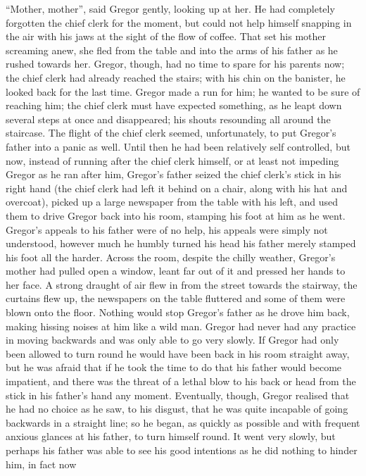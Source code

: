“Mother, mother”, said Gregor gently, looking up at her. He had
completely forgotten the chief clerk for the moment, but could not help
himself snapping in the air with his jaws at the sight of the flow of
coffee. That set his mother screaming anew, she fled from the table and
into the arms of his father as he rushed towards her. Gregor, though,
had no time to spare for his parents now; the chief clerk had already
reached the stairs; with his chin on the banister, he looked back for
the last time. Gregor made a run for him; he wanted to be sure of
reaching him; the chief clerk must have expected something, as he leapt
down several steps at once and disappeared; his shouts resounding all
around the staircase. The flight of the chief clerk seemed,
unfortunately, to put Gregor’s father into a panic as well. Until then
he had been relatively self controlled, but now, instead of running
after the chief clerk himself, or at least not impeding Gregor as he
ran after him, Gregor’s father seized the chief clerk’s stick in his
right hand (the chief clerk had left it behind on a chair, along with
his hat and overcoat), picked up a large newspaper from the table with
his left, and used them to drive Gregor back into his room, stamping
his foot at him as he went. Gregor’s appeals to his father were of no
help, his appeals were simply not understood, however much he humbly
turned his head his father merely stamped his foot all the harder.
Across the room, despite the chilly weather, Gregor’s mother had pulled
open a window, leant far out of it and pressed her hands to her face. A
strong draught of air flew in from the street towards the stairway, the
curtains flew up, the newspapers on the table fluttered and some of
them were blown onto the floor. Nothing would stop Gregor’s father as
he drove him back, making hissing noises at him like a wild man. Gregor
had never had any practice in moving backwards and was only able to go
very slowly. If Gregor had only been allowed to turn round he would
have been back in his room straight away, but he was afraid that if he
took the time to do that his father would become impatient, and there
was the threat of a lethal blow to his back or head from the stick in
his father’s hand any moment. Eventually, though, Gregor realised that
he had no choice as he saw, to his disgust, that he was quite incapable
of going backwards in a straight line; so he began, as quickly as
possible and with frequent anxious glances at his father, to turn
himself round. It went very slowly, but perhaps his father was able to
see his good intentions as he did nothing to hinder him, in fact now
